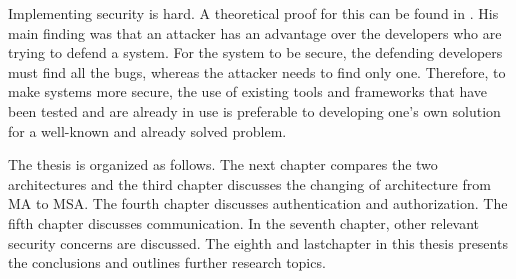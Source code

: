 \begin{sloppypar}
    Implementing security is hard. A theoretical proof for this can be found in
    \citet{andersson2001information}. His main finding was that an attacker has
    an advantage over the developers who are trying to defend a system. For the system
    to be secure, the defending developers must find all the bugs, whereas the
    attacker needs to find only one. Therefore, to make systems more secure, the use
    of existing tools and frameworks that have been tested and are already in use is
    preferable to developing one's own solution for a well-known and already
    solved problem.
\end{sloppypar}
\begin{sloppypar}
    The thesis is organized as follows. The next chapter compares the two
    architectures and the third chapter discusses the changing of architecture
    from MA to MSA. The fourth chapter discusses authentication and
    authorization. The fifth chapter discusses communication. In the seventh
    chapter, other relevant security concerns are discussed. The eighth and
    lastchapter in this thesis presents the conclusions and outlines further
    research topics.
\end{sloppypar}




